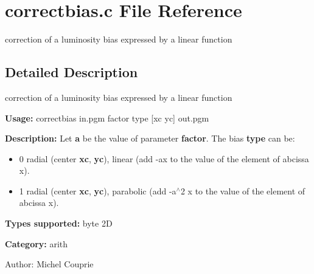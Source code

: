 \section{correctbias.c File Reference}
\label{correctbias_8c}
correction of a luminosity bias expressed by a linear function  




\label{_details}
\subsection{Detailed Description}
correction of a luminosity bias expressed by a linear function 

{\bf Usage:} correctbias in.pgm factor type [xc yc] out.pgm

{\bf Description:} Let {\bf a} be the value of parameter {\bf factor}. The bias {\bf type} can be: \begin{itemize}
\item 0 radial (center {\bf xc}, {\bf yc}), linear (add -ax to the value of the element of abcissa x). \item 1 radial (center {\bf xc}, {\bf yc}), parabolic (add -a$^\wedge$2 x to the value of the element of abcissa x).\end{itemize}
{\bf Types supported:} byte 2D

{\bf Category:} arith

\begin{Desc}
\item[Author:]Michel Couprie \end{Desc}
